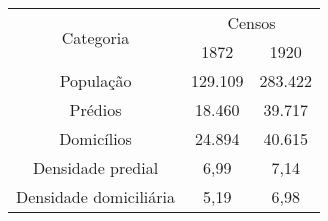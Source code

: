 \begin{table}[!htp]
{
\begin{tabular}{ccc}
\hline 
\multirow{2}{*}{Categoria} & \multicolumn{2}{c|}{Censos} \\ 
\cline{2-3} 
 & 1872 & 1920 \\ 
\hline 
População & 129.109 & 283.422 \\ 
\hline 
Prédios & 18.460 & 39.717 \\ 
\hline 
Domicílios & 24.894 & 40.615 \\ 
\hline 
Densidade predial & 6,99 & 7,14 \\ 
\hline 
Densidade domiciliária & 5,19 & 6,98 \\ 
\hline 
\end{tabular} 
}
{}
\end{table}